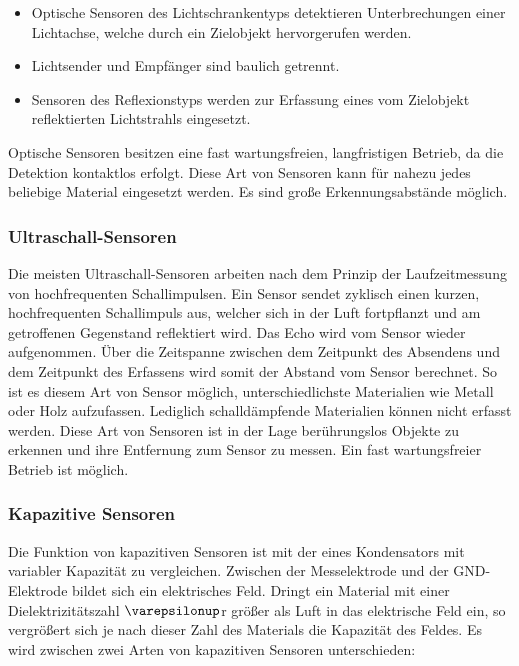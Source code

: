 \begin{itemize}
    \item Optische Sensoren des Lichtschrankentyps detektieren Unterbrechungen einer Lichtachse, welche durch ein Zielobjekt hervorgerufen werden.
    \item Lichtsender und Empfänger sind baulich getrennt.

    \item Sensoren des Reflexionstyps werden zur Erfassung eines vom Zielobjekt reflektierten Lichtstrahls eingesetzt.
\end{itemize}

Optische Sensoren besitzen eine fast wartungsfreien, langfristigen Betrieb, da die Detektion kontaktlos erfolgt.
Diese Art von Sensoren kann für nahezu jedes beliebige Material eingesetzt werden.
Es sind große Erkennungsabstände möglich.

\subsubsection{Ultraschall-Sensoren}
Die meisten Ultraschall-Sensoren arbeiten nach dem Prinzip der Laufzeitmessung von hochfrequenten Schallimpulsen.
Ein Sensor sendet zyklisch einen kurzen, hochfrequenten Schallimpuls aus, welcher sich in der Luft fortpflanzt und am getroffenen Gegenstand reflektiert wird.
Das Echo wird vom Sensor wieder aufgenommen.
Über die Zeitspanne zwischen dem Zeitpunkt des Absendens und dem Zeitpunkt des Erfassens wird somit der Abstand vom Sensor berechnet.
So ist es diesem Art von Sensor möglich, unterschiedlichste Materialien wie Metall oder Holz aufzufassen.
Lediglich schalldämpfende Materialien können nicht erfasst werden.
Diese Art von Sensoren ist in der Lage berührungslos Objekte zu erkennen und ihre Entfernung zum Sensor zu messen.
Ein fast wartungsfreier Betrieb ist möglich.

\subsubsection{Kapazitive Sensoren}
Die Funktion von kapazitiven Sensoren ist mit der eines Kondensators mit variabler Kapazität zu vergleichen.
Zwischen der Messelektrode und der \acs{GND}-Elektrode bildet sich ein elektrisches Feld.
Dringt ein Material mit einer Dielektrizitätszahl $\varepsilonup$r größer als Luft in das elektrische Feld ein, so vergrößert sich je nach dieser Zahl des Materials die Kapazität des Feldes.
Es wird zwischen zwei Arten von kapazitiven Sensoren unterschieden: \\

